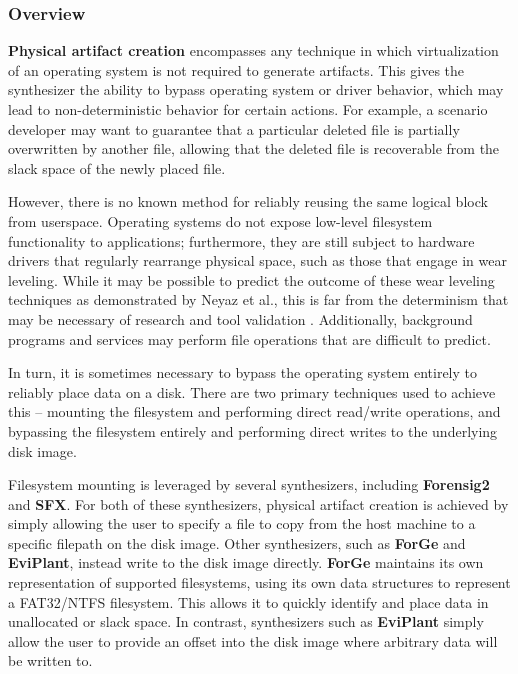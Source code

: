 \subsubsection{Overview}\label{overview-1}

\textbf{Physical artifact creation} encompasses any technique in which
virtualization of an operating system is not required to generate
artifacts. This gives the synthesizer the ability to bypass operating
system or driver behavior, which may lead to non-deterministic behavior
for certain actions. For example, a scenario developer may want to
guarantee that a particular deleted file is partially overwritten by
another file, allowing that the deleted file is recoverable from the
slack space of the newly placed file.

However, there is no known method for reliably reusing the same logical
block from userspace. Operating systems do not expose low-level
filesystem functionality to applications; furthermore, they are still
subject to hardware drivers that regularly rearrange physical space,
such as those that engage in wear leveling. While it may be possible to
predict the outcome of these wear leveling techniques as demonstrated by
Neyaz et al., this is far from the determinism that may be necessary of
research and tool validation \cite{neyazForensicAnalysisWear2018}.
Additionally, background programs and services may perform file
operations that are difficult to predict.

In turn, it is sometimes necessary to bypass the operating system
entirely to reliably place data on a disk. There are two primary
techniques used to achieve this -- mounting the filesystem and
performing direct read/write operations, and bypassing the filesystem
entirely and performing direct writes to the underlying disk image.

Filesystem mounting is leveraged by several synthesizers, including
\textbf{Forensig2} and \textbf{SFX}. For both of these synthesizers,
physical artifact creation is achieved by simply allowing the user to
specify a file to copy from the host machine to a specific filepath on
the disk image. Other synthesizers, such as \textbf{ForGe} and
\textbf{EviPlant}, instead write to the disk image directly.
\textbf{ForGe} maintains its own representation of supported
filesystems, using its own data structures to represent a FAT32/NTFS
filesystem. This allows it to quickly identify and place data in
unallocated or slack space. In contrast, synthesizers such as
\textbf{EviPlant} simply allow the user to provide an offset into the
disk image where arbitrary data will be written to.

